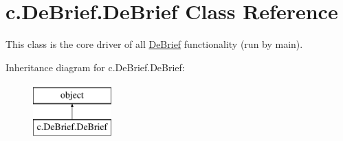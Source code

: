 \hypertarget{classc_1_1_de_brief_1_1_de_brief}{}\section{c.\+De\+Brief.\+De\+Brief Class Reference}
\label{classc_1_1_de_brief_1_1_de_brief}


This class is the core driver of all \hyperlink{classc_1_1_de_brief_1_1_de_brief}{De\+Brief} functionality (run by main).  


Inheritance diagram for c.\+De\+Brief.\+De\+Brief\+:\begin{figure}[H]
\begin{center}
\leavevmode
\includegraphics[height=2.000000cm]{classc_1_1_de_brief_1_1_de_brief}
\end{center}
\end{figure}
